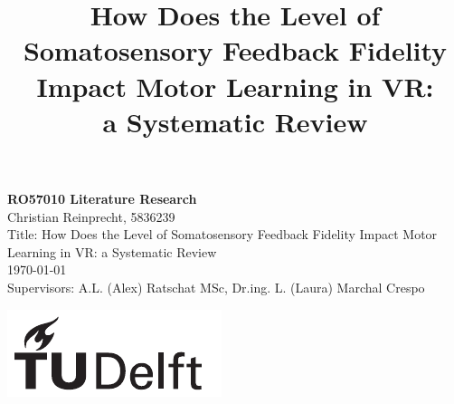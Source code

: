 \documentclass[conference]{IEEEtran}
\begin{document}
\newpage
\thispagestyle{empty}
\begin{onecolumn}
\begin{center}
\vspace*{4cm}
\huge{\textbf{RO57010 Literature Research}}\\[1.5cm]
\Large{Christian Reinprecht, 5836239}\\[1.5cm]
\Large{Title: How Does the Level of Somatosensory Feedback Fidelity Impact Motor Learning in VR: a Systematic Review}\\[1.5cm]

\Large{\today}\\[1.5cm]

\Large{Supervisors: A.L. (Alex) Ratschat MSc, Dr.ing. L. (Laura) Marchal Crespo} \vfill

\includegraphics{figures/logo-black}

\end{center}
\end{onecolumn}
\newpage

\setcounter{page}{1}
\twocolumn

\title{How Does the Level of Somatosensory Feedback Fidelity Impact Motor Learning in VR: \\a Systematic Review}

\author{
}

\maketitle
\thispagestyle{plain}
\pagestyle{plain}
\end{document}
